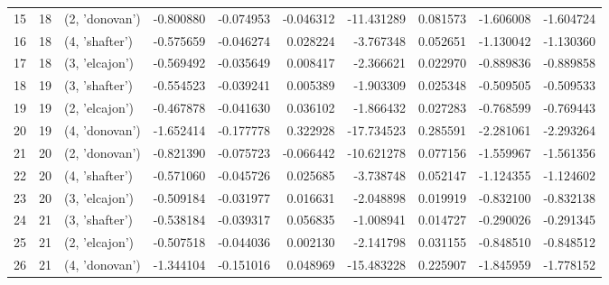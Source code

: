 \begin{tabular}{lrlrrrrrrr}
15 &     18 &  (2, 'donovan') & -0.800880 &  -0.074953 & -0.046312 & -11.431289 &  0.081573 &  -1.606008 & -1.604724 \\
16 &     18 &  (4, 'shafter') & -0.575659 &  -0.046274 &  0.028224 &  -3.767348 &  0.052651 &  -1.130042 & -1.130360 \\
17 &     18 &  (3, 'elcajon') & -0.569492 &  -0.035649 &  0.008417 &  -2.366621 &  0.022970 &  -0.889836 & -0.889858 \\
18 &     19 &  (3, 'shafter') & -0.554523 &  -0.039241 &  0.005389 &  -1.903309 &  0.025348 &  -0.509505 & -0.509533 \\
19 &     19 &  (2, 'elcajon') & -0.467878 &  -0.041630 &  0.036102 &  -1.866432 &  0.027283 &  -0.768599 & -0.769443 \\
20 &     19 &  (4, 'donovan') & -1.652414 &  -0.177778 &  0.322928 & -17.734523 &  0.285591 &  -2.281061 & -2.293264 \\
21 &     20 &  (2, 'donovan') & -0.821390 &  -0.075723 & -0.066442 & -10.621278 &  0.077156 &  -1.559967 & -1.561356 \\
22 &     20 &  (4, 'shafter') & -0.571060 &  -0.045726 &  0.025685 &  -3.738748 &  0.052147 &  -1.124355 & -1.124602 \\
23 &     20 &  (3, 'elcajon') & -0.509184 &  -0.031977 &  0.016631 &  -2.048898 &  0.019919 &  -0.832100 & -0.832138 \\
24 &     21 &  (3, 'shafter') & -0.538184 &  -0.039317 &  0.056835 &  -1.008941 &  0.014727 &  -0.290026 & -0.291345 \\
25 &     21 &  (2, 'elcajon') & -0.507518 &  -0.044036 &  0.002130 &  -2.141798 &  0.031155 &  -0.848510 & -0.848512 \\
26 &     21 &  (4, 'donovan') & -1.344104 &  -0.151016 &  0.048969 & -15.483228 &  0.225907 &  -1.845959 & -1.778152 \\
\bottomrule
\end{tabular}
